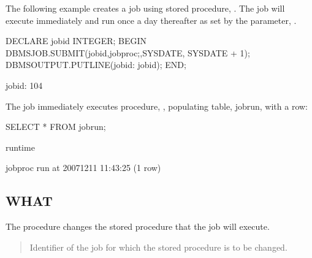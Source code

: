 \documentclass[letterpaper,10pt,english,openany,oneside]{sphinxmanual}
\begin{document}
The following example creates a job using stored procedure, .
The job will execute immediately and run once a day thereafter as set by
the  parameter, .

%
\begin{sphinxVerbatim}[commandchars=\\\{\}]
DECLARE
   jobid INTEGER;
BEGIN
   DBMS\PYGZus{}JOB.SUBMIT(jobid,\PYGZsq{}job\PYGZus{}proc;\PYGZsq{},SYSDATE,
       \PYGZsq{}SYSDATE + 1\PYGZsq{});
   DBMS\PYGZus{}OUTPUT.PUT\PYGZus{}LINE(\PYGZsq{}jobid: \PYGZsq{} \textbar{}\textbar{} jobid);
END;

jobid: 104
\end{sphinxVerbatim}

The job immediately executes procedure, , populating table,
jobrun, with a row:

%
\begin{sphinxVerbatim}[commandchars=\\\{\}]
SELECT * FROM jobrun;

               runtime

\PYGZhy{}\PYGZhy{}\PYGZhy{}\PYGZhy{}\PYGZhy{}\PYGZhy{}\PYGZhy{}\PYGZhy{}\PYGZhy{}\PYGZhy{}\PYGZhy{}\PYGZhy{}\PYGZhy{}\PYGZhy{}\PYGZhy{}\PYGZhy{}\PYGZhy{}\PYGZhy{}\PYGZhy{}\PYGZhy{}\PYGZhy{}\PYGZhy{}\PYGZhy{}\PYGZhy{}\PYGZhy{}\PYGZhy{}\PYGZhy{}\PYGZhy{}\PYGZhy{}\PYGZhy{}\PYGZhy{}\PYGZhy{}\PYGZhy{}\PYGZhy{}\PYGZhy{}\PYGZhy{}\PYGZhy{}
  job\PYGZus{}proc run at 2007\PYGZhy{}12\PYGZhy{}11 11:43:25
  (1 row)
\end{sphinxVerbatim}

\newpage


\subsection{WHAT}
\label{\detokenize{what::doc}}\label{\detokenize{what:what}}
The  procedure changes the stored procedure that the job will
execute.



\begin{quote}

Identifier of the job for which the stored procedure is to be changed.
\end{quote}
\end{document}
